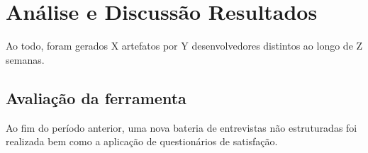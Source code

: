\chapter{Análise e Discussão Resultados}

Ao todo, foram gerados X artefatos por Y desenvolvedores distintos ao longo de Z semanas.

\section{Avaliação da ferramenta}

Ao fim do período anterior, uma nova bateria de entrevistas não estruturadas foi realizada bem como a aplicação de questionários de satisfação.
